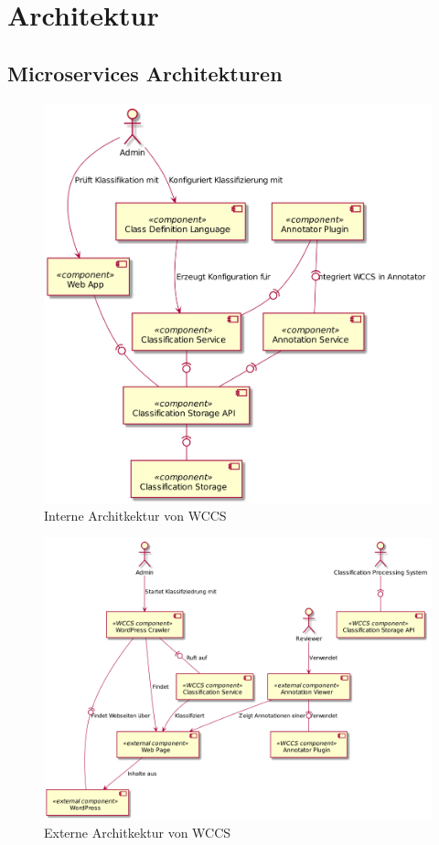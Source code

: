 \section{Architektur}
    \label{section:Architecture}
    \subsection{Microservices Architekturen}

    \begin{figure}
        \centering
        \includegraphics[width=\textwidth]{../resources/architecture/wccs_internal_architecture.png}
        \caption{Interne Architkektur von WCCS}
        \label{image:wccsInternalArchitecture}
    \end{figure}

    \begin{figure}
        \centering
        \includegraphics[width=\textwidth]{../resources/architecture/external_architecture.png}
        \caption{Externe Architkektur von WCCS}
        \label{image:wccsExternalArchitecture}
    \end{figure}